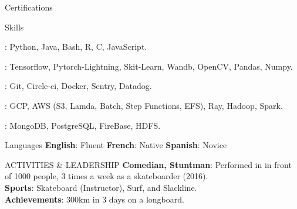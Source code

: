 \documentclass{resume}
\begin{document}
\begin{multicols}{2}
\begin{rSection}{\Large Certifications}
\begin{description}
		\end{description}
	\end{rSection}

	\begin{rSection}{\Large Skills}
		\begin{description}
			\setlength\itemsep{-0.5em}
			\item[$\bullet$ Languages]: Python, Java, Bash, R, C, JavaScript.
			\item[$\bullet$ Libraries]: Tensorflow, Pytorch-Lightning, Skit-Learn, Wandb, OpenCV, Pandas, Numpy.
			\item[$\bullet$ Tools]: Git, Circle-ci, Docker, Sentry, Datadog.
			\item[$\bullet$ Cloud]:  GCP, AWS (S3, Lamda, Batch, Step Functions, EFS), Ray, Hadoop, Spark.
			\item[$\bullet$ Databases]: MongoDB, PostgreSQL, FireBase, HDFS.
		\end{description}
	\end{rSection}

	\begin{rSection}{\Large Languages}
		\textbf{English}:  Fluent \hspace{1ex} \textbf{French}: Native \hspace{1ex} \textbf{Spanish}:  Novice
	\end{rSection}

	\begin{rSection}{\Large ACTIVITIES \& LEADERSHIP}
		\textbf{Comedian, Stuntman}: Performed in  in front of 1000 people, 3 times a week as a skateboarder (2016).\\
		\textbf{Sports}: Skateboard (Instructor), Surf, and Slackline.\\
		\textbf{Achievements}: 300km in 3 days on a longboard.
	\end{rSection}
	
	\end{multicols}
\end{document}
